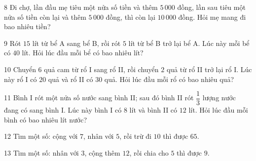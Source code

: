 \gap
\begin{probbox}{8}{\relax}
Đi chợ, lần đầu mẹ tiêu một nửa số tiền và thêm $5\,000$ đồng, lần sau tiêu một nửa số tiền còn lại và thêm $5\,000$ đồng, thì còn lại $10\,000$ đồng. Hỏi mẹ mang đi bao nhiêu tiền?
\end{probbox}
\gap
\begin{probbox}{9}{\relax}
Rót $15$ lít từ bể A sang bể B, rồi rót $5$ lít từ bể B trở lại bể A. Lúc này mỗi bể có $40$ lít. Hỏi lúc đầu mỗi bể có bao nhiêu lít?
\end{probbox}
\gap
\begin{probbox}{10}{\relax}
Chuyển $6$ quả cam từ rổ I sang rổ II, rồi chuyển $2$ quả từ rổ II trở lại rổ I. Lúc này rổ I có $20$ quả và rổ II có $30$ quả. Hỏi lúc đầu mỗi rổ có bao nhiêu quả?
\end{probbox}
\gap
\begin{probbox}{11}{\relax}
Bình I rót một nửa số nước sang bình II; sau đó bình II rót $\dfrac13$ lượng nước đang có sang bình I. Lúc này bình I có $8$ lít và bình II có $12$ lít. Hỏi lúc đầu mỗi bình có bao nhiêu lít nước?
\end{probbox}
\gap
\begin{probbox}{12}{\relax}
Tìm một số: cộng với $7$, nhân với $5$, rồi trừ đi $10$ thì được $65$.
\end{probbox}
\gap
\begin{probbox}{13}{\relax}
Tìm một số: nhân với $3$, cộng thêm $12$, rồi chia cho $5$ thì được $9$.
\end{probbox}
